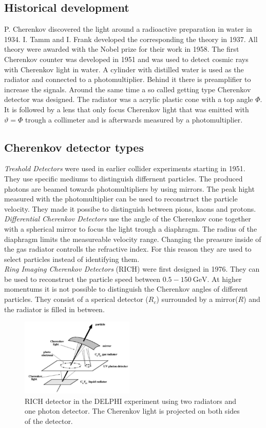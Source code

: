 \subsection{Historical development}
P. Cherenkov discovered the light around a radioactive preparation in water in 1934. I. Tamm and I. Frank developed the corresponding the theory in 1937. All theory were awarded with the Nobel prize for their work in 1958. The first Cherenkov counter was developed in 1951 and was used to detect cosmic rays with Cherenkov light in water. A cylinder with distilled water is used as the radiator and connected to a photomultiplier. Behind it there is preamplifier to increase the signals.
Around the same time a so called getting type Cherenkov detector was designed. The radiator was a acrylic plastic cone with a top angle $\Phi$. It is followed by a lens that only focus Cherenkov light that was emitted with $\vartheta = \Phi$ trough a collimeter and is afterwards measured by a photomultiplier.
\subsection{Cherenkov detector types}
\textit{Treshold Detectors} were used in earlier collider experiments starting in 1951. They use specific mediums to distinguish differnent particles. The produced photons are beamed towards photomultipliers by using mirrors. The peak hight measured with the photomultiplier can be used to reconstruct the particle velocity. They made it possibe to distinguish between pions, kaons and protons.
\textit{Differential Cherenkov Detectors} use the angle of the Cherenkov cone together with a spherical mirror to focus the light trough a diaphragm. The radius of the diaphragm limits the measureable velocity range. Changing the preasure inside of the gas radiator controlls the refractive index. For this reason they are used to select particles instead of identifying them.\\
\textit{Ring Imaging Cherenkov Detectors} (RICH) were first designed in 1976. They can be used to reconstruct the particle speed between $0.5-\SI{150}{\giga\electronvolt}$. At higher momentums it is not possible to distinguish the Cherenkov angles of different particles. They consist of a sperical detector ($R_c$) surrounded by a mirror($R$) and the radiator is filled in between.

\begin{figure}
    \includegraphics[width=0.48\textwidth]{graphics/RICH.png}
    \caption{RICH detector in the DELPHI experiment using two radiators and one photon detector. The Cherenkov light is projected on both sides of the detector. \cite{cherenkov}}
		\label{fig:RICH}
  \end{figure}
  \FloatBarrier

